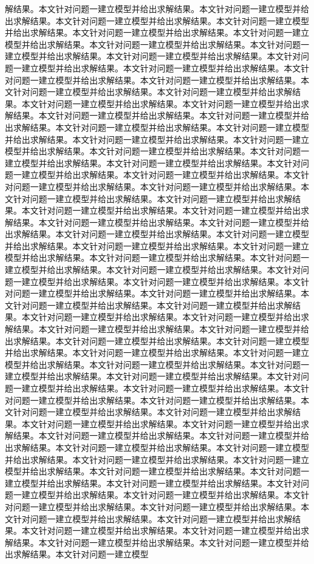 解结果。本文针对问题一建立模型并给出求解结果。本文针对问题一建立模型并给出求解结果。本文针对问题一建立模型并给出求解结果。本文针对问题一建立模型并给出求解结果。本文针对问题一建立模型并给出求解结果。本文针对问题一建立模型并给出求解结果。本文针对问题一建立模型并给出求解结果。本文针对问题一建立模型并给出求解结果。本文针对问题一建立模型并给出求解结果。本文针对问题一建立模型并给出求解结果。本文针对问题一建立模型并给出求解结果。本文针对问题一建立模型并给出求解结果。本文针对问题一建立模型并给出求解结果。本文针对问题一建立模型并给出求解结果。本文针对问题一建立模型并给出求解结果。本文针对问题一建立模型并给出求解结果。本文针对问题一建立模型并给出求解结果。本文针对问题一建立模型并给出求解结果。本文针对问题一建立模型并给出求解结果。本文针对问题一建立模型并给出求解结果。本文针对问题一建立模型并给出求解结果。本文针对问题一建立模型并给出求解结果。本文针对问题一建立模型并给出求解结果。本文针对问题一建立模型并给出求解结果。本文针对问题一建立模型并给出求解结果。本文针对问题一建立模型并给出求解结果。本文针对问题一建立模型并给出求解结果。本文针对问题一建立模型并给出求解结果。本文针对问题一建立模型并给出求解结果。本文针对问题一建立模型并给出求解结果。本文针对问题一建立模型并给出求解结果。本文针对问题一建立模型并给出求解结果。本文针对问题一建立模型并给出求解结果。本文针对问题一建立模型并给出求解结果。本文针对问题一建立模型并给出求解结果。本文针对问题一建立模型并给出求解结果。本文针对问题一建立模型并给出求解结果。本文针对问题一建立模型并给出求解结果。本文针对问题一建立模型并给出求解结果。本文针对问题一建立模型并给出求解结果。本文针对问题一建立模型并给出求解结果。本文针对问题一建立模型并给出求解结果。本文针对问题一建立模型并给出求解结果。本文针对问题一建立模型并给出求解结果。本文针对问题一建立模型并给出求解结果。本文针对问题一建立模型并给出求解结果。本文针对问题一建立模型并给出求解结果。本文针对问题一建立模型并给出求解结果。本文针对问题一建立模型并给出求解结果。本文针对问题一建立模型并给出求解结果。本文针对问题一建立模型并给出求解结果。本文针对问题一建立模型并给出求解结果。本文针对问题一建立模型并给出求解结果。本文针对问题一建立模型并给出求解结果。本文针对问题一建立模型并给出求解结果。本文针对问题一建立模型并给出求解结果。本文针对问题一建立模型并给出求解结果。本文针对问题一建立模型并给出求解结果。本文针对问题一建立模型并给出求解结果。本文针对问题一建立模型并给出求解结果。本文针对问题一建立模型并给出求解结果。本文针对问题一建立模型并给出求解结果。本文针对问题一建立模型并给出求解结果。本文针对问题一建立模型并给出求解结果。本文针对问题一建立模型并给出求解结果。本文针对问题一建立模型并给出求解结果。本文针对问题一建立模型并给出求解结果。本文针对问题一建立模型并给出求解结果。本文针对问题一建立模型并给出求解结果。本文针对问题一建立模型并给出求解结果。本文针对问题一建立模型并给出求解结果。本文针对问题一建立模型并给出求解结果。本文针对问题一建立模型并给出求解结果。本文针对问题一建立模型并给出求解结果。本文针对问题一建立模型并给出求解结果。本文针对问题一建立模型并给出求解结果。本文针对问题一建立模型并给出求解结果。本文针对问题一建立模型并给出求解结果。本文针对问题一建立模型并给出求解结果。本文针对问题一建立模型并给出求解结果。本文针对问题一建立模型并给出求解结果。本文针对问题一建立模型并给出求解结果。本文针对问题一建立模型并给出求解结果。本文针对问题一建立模型并给出求解结果。本文针对问题一建立模型并给出求解结果。本文针对问题一建立模型并给出求解结果。本文针对问题一建立模型并给出求解结果。本文针对问题一建立模型